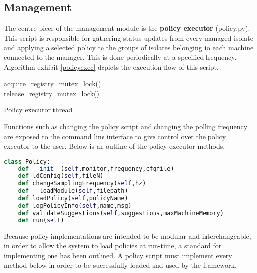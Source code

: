 \documentclass{l4proj}
\begin{document}
\subsection{Management}
\hspace*{1em} The centre piece of the management module is the \textbf{policy executor} (policy.py). This script is responsible for gathering status updates from every managed isolate and applying a selected policy to the groups of isolates belonging to each machine connected to the manager. This is done periodically at a specified frequency. Algorithm exhibit \ref{policyexec} depicts the execution flow of this script.\\
\begin{algorithm}[H]
 acquire\_registry\_mutex\_lock()\\
 release\_registry\_mutex\_lock()
 \caption{Policy executor thread}
 \label{policyexec}
\end{algorithm}
Functions such as changing the policy script and changing the polling frequency are exposed to the command line interface to give control over the policy executor to the user. Below is an outline of the policy executor methods.
\begin{lstlisting}[language=python]
class Policy:
    def __init__(self,monitor,frequency,cfgfile)
    def ldConfig(self,fileN)
    def changeSamplingFrequency(self,hz)
    def __loadModule(self,filepath)
    def loadPolicy(self,policyName)
    def logPolicyInfo(self,name,msg)
    def validateSuggestions(self,suggestions,maxMachineMemory)
    def run(self)
\end{lstlisting}
\hspace*{1em} Because policy implementations are intended to be modular and interchangeable, in order to allow the system to load policies at run-time, a standard for implementing one has been outlined. A policy script must implement every method below in order to be successfully loaded and used by the framework. 
\end{document}
